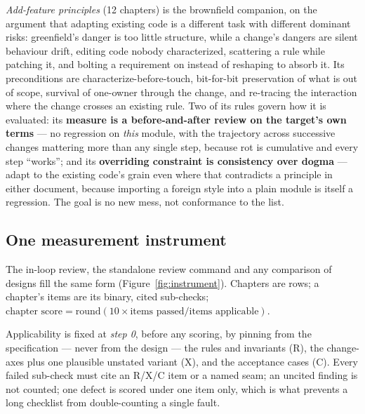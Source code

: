 \documentclass[11pt]{article}
\begin{document}
\emph{Add-feature principles} (12 chapters) is the brownfield companion, on the argument that adapting existing code is a different task with different dominant risks: greenfield's danger is too little structure, while a change's dangers are silent behaviour drift, editing code nobody characterized, scattering a rule while patching it, and bolting a requirement on instead of reshaping to absorb it. Its preconditions are characterize-before-touch, bit-for-bit preservation of what is out of scope, survival of one-owner through the change, and re-tracing the interaction where the change crosses an existing rule. Two of its rules govern how it is evaluated: its \textbf{measure is a before-and-after review on the target's own terms} --- no regression on \emph{this} module, with the trajectory across successive changes mattering more than any single step, because rot is cumulative and every step ``works''; and its \textbf{overriding constraint is consistency over dogma} --- adapt to the existing code's grain even where that contradicts a principle in either document, because importing a foreign style into a plain module is itself a regression. The goal is no new mess, not conformance to the list.

\subsection{One measurement instrument}
\label{sec:instrument}

The in-loop review, the standalone review command and any comparison of designs fill the same form (Figure~\ref{fig:instrument}). Chapters are rows; a chapter's items are its binary, cited sub-checks; $\textrm{chapter score} = \mathrm{round}(10 \times \textrm{items passed} / \textrm{items applicable})$.

Applicability is fixed at \emph{step 0}, before any scoring, by pinning from the specification --- never from the design --- the rules and invariants (R), the change-axes plus one plausible unstated variant (X), and the acceptance cases (C). Every failed sub-check must cite an R/X/C item or a named seam; an uncited finding is not counted; one defect is scored under one item only, which is what prevents a long checklist from double-counting a single fault.
\end{document}
